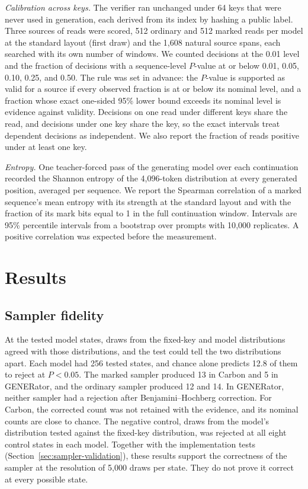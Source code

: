 \documentclass[10pt,twocolumn]{article}
\begin{document}
\textit{Calibration across keys.} The verifier ran unchanged under 64 keys that were never used in
generation, each derived from its index by hashing a public label. Three sources of reads were
scored, 512 ordinary and 512 marked reads per model at the standard layout (first draw) and the 1{,}608
natural source spans, each searched with its own number of windows. We counted decisions at the 0.01
level and the fraction of decisions with a sequence-level $P$-value at or below 0.01, 0.05, 0.10,
0.25, and 0.50. The rule was set in advance: the $P$-value is supported as valid for a source if
every observed fraction is at or below its nominal level, and a fraction whose exact one-sided 95\%
lower bound exceeds its nominal level is evidence against validity. Decisions on one read under
different keys share the read, and decisions under one key share the key, so the exact intervals
treat dependent decisions as independent. We also report the fraction of reads positive under at
least one key.

\textit{Entropy.} One teacher-forced pass of the generating model over each continuation recorded the
Shannon entropy of the 4{,}096-token distribution at every generated position, averaged per
sequence. We report the Spearman correlation of a marked sequence's mean entropy with its strength
at the standard layout and with the fraction of its mark bits equal to 1 in the full continuation
window. Intervals are 95\% percentile intervals from a bootstrap over prompts with 10{,}000
replicates. A positive correlation was expected before the measurement.

\section{Results}
\label{sec:results}

\subsection{Sampler fidelity}

At the tested model states, draws from the fixed-key and model distributions agreed with those
distributions, and the test could tell the two distributions apart. Each model had 256 tested
states, and chance alone predicts 12.8 of them to reject at $P < 0.05$. The marked sampler produced 13 in
Carbon and 5 in GENERator, and the ordinary sampler produced 12 and 14. In GENERator, neither
sampler had a rejection after Benjamini--Hochberg correction. For Carbon, the corrected count was
not retained with the evidence, and its nominal counts are close to chance. The negative control,
draws from the model's distribution tested against the fixed-key distribution, was rejected at all
eight control states in each model. Together with the implementation tests
(Section~\ref{sec:sampler-validation}), these results support the correctness of the sampler at
the resolution of 5{,}000 draws per state. They do not prove it correct at every possible state.
\end{document}
